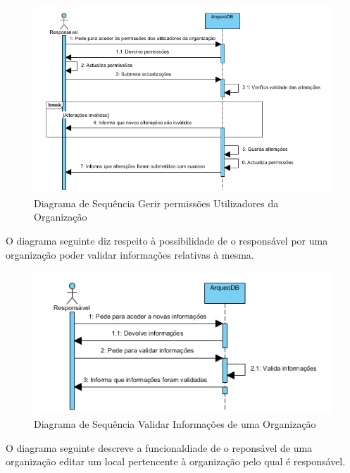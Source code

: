 ﻿\documentclass[12pt,a4paper]{article}
\begin{document}
\begin{figure}[h!]
\centering
\includegraphics[scale=1]{sequencia/R_permissoes}
\caption{Diagrama de Sequência Gerir permissões Utilizadores da Organização} 
\end{figure}  

\clearpage
O diagrama seguinte diz respeito à possibilidade de o responsável por uma organização poder validar informações relativas à mesma.\\

\begin{figure}[h!]
\centering
\includegraphics[scale=1]{sequencia/validarinf}
\caption{Diagrama de Sequência Validar Informações de uma Organização}  
\end{figure}


\clearpage
O diagrama seguinte descreve a funcionaldiade de o reponsável de uma organização editar um local pertencente à organização pelo qual é responsável.\\
\end{document}

